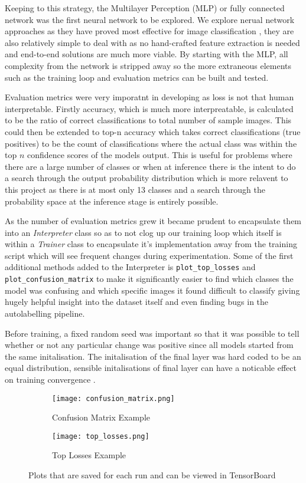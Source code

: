 Keeping to this strategy, the Multilayer Perception (MLP) or fully connected network \cite{} was the first neural network to be explored.
We explore nerual network approaches as they have proved most effective for image classification \cite{}, they are also relatively simple to deal
with as no hand-crafted feature extraction is needed and end-to-end solutions are much more viable.
By starting with the MLP, all complexity from the network is stripped away so the more extraneous elements such as the training loop and 
evaluation metrics can be built and tested.

Evaluation metrics were very imporatnt in developing as loss is not that human interpretable.  Firstly accuracy, which is much more interpreatable, 
is calculated to be the ratio of correct classifications to total number of sample images.  This could then be extended to top-n accuracy which 
takes correct classifications (true positives) to be the count of classifications where the actual class was within the top $n$ confidence scores 
of the models output.  This is useful for problems where there are a large number of classes or when at inference there is the intent to do a search
through the output probability distribution which is more relavent to this project as there is at most only 13 classes and a search through the probability 
space at the inference stage is entirely possible.


As the number of evaluation metrics grew it became prudent to encapsulate them into an \textit{Interpreter} class so as to not clog up our 
training loop which itself is within a \textit{Trainer} class to encapsulate it's implementation away from the training script which will 
see frequent changes during experimentation.  Some of the first additional methods added to the Interpreter is \verb|plot_top_losses| and
\verb|plot_confusion_matrix| to make it significantly easier to find which classes the model was confusing and which specific images it 
found difficult to classify giving hugely helpful insight into the dataset itself and even finding bugs in the autolabelling pipeline.

Before training, a fixed random seed was important so that it was possible to tell whether or not any particular change was positive since all models started
from the same initalisation.  The initalisation of the final layer was hard coded to be an equal distribution, sensible initalisations of final layer can have 
a noticable effect on training convergence \cite{}.

\begin{figure}[h]
    \centering
    \begin{subfigure}[b]{0.49\textwidth}
        \centering
        \texttt{[image: confusion\_matrix.png]}
        \caption{Confusion Matrix Example}
    \end{subfigure}
    \hfill
    \begin{subfigure}[b]{0.49\textwidth}
        \centering
        \texttt{[image: top\_losses.png]}
        \caption{Top Losses Example}
    \end{subfigure}
\caption{Plots that are saved for each run and can be viewed in TensorBoard}
\label{fig:plots}
\end{figure}

